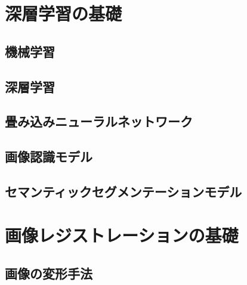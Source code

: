 
\appendix
\thispagestyle{fancy} %

\chapter{深層学習の基礎}

\section{機械学習}


\section{深層学習}


\section{畳み込みニューラルネットワーク}


\section{画像認識モデル}


\section{セマンティックセグメンテーションモデル}


%

\chapter{画像レジストレーションの基礎}

\section{画像の変形手法}
\label{appendix_transformation}
